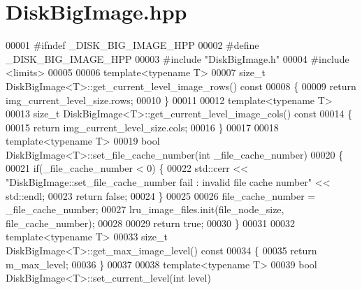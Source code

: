 \section{Disk\-Big\-Image.\-hpp}
\label{_disk_big_image_8hpp}

\begin{DoxyCode}
00001 \textcolor{preprocessor}{#ifndef \_DISK\_BIG\_IMAGE\_HPP}
00002 \textcolor{preprocessor}{}\textcolor{preprocessor}{#define \_DISK\_BIG\_IMAGE\_HPP}
00003 \textcolor{preprocessor}{}\textcolor{preprocessor}{#include "DiskBigImage.h"}
00004 \textcolor{preprocessor}{#include <limits>}
00005 
00006 \textcolor{keyword}{template}<\textcolor{keyword}{typename} T>
00007 \textcolor{keywordtype}{size\_t} DiskBigImage<T>::get_current_level_image_rows()\textcolor{keyword}{ const }
00008 \textcolor{keyword}{}\{
00009         \textcolor{keywordflow}{return} img\_current\_level\_size.rows;
00010 \}
00011 
00012 \textcolor{keyword}{template}<\textcolor{keyword}{typename} T>
00013 \textcolor{keywordtype}{size\_t} DiskBigImage<T>::get_current_level_image_cols()\textcolor{keyword}{ const }
00014 \textcolor{keyword}{}\{
00015         \textcolor{keywordflow}{return} img\_current\_level\_size.cols;
00016 \}
00017 
00018 \textcolor{keyword}{template}<\textcolor{keyword}{typename} T>
00019 \textcolor{keywordtype}{bool} DiskBigImage<T>::set_file_cache_number(\textcolor{keywordtype}{int} \_file\_cache\_number)
00020 \{
00021         \textcolor{keywordflow}{if}(\_file\_cache\_number < 0) \{
00022                 std::cerr << \textcolor{stringliteral}{"DiskBigImage::set\_file\_cache\_number fail :
       invalid file cache number"} << std::endl;
00023                 \textcolor{keywordflow}{return} \textcolor{keyword}{false};
00024         \}
00025 
00026         file\_cache\_number = \_file\_cache\_number;
00027         lru\_image\_files.init(file\_node\_size, file\_cache\_number);
00028 
00029         \textcolor{keywordflow}{return} \textcolor{keyword}{true};
00030 \}
00031 
00032 \textcolor{keyword}{template}<\textcolor{keyword}{typename} T>
00033 \textcolor{keywordtype}{size\_t} DiskBigImage<T>::get_max_image_level()\textcolor{keyword}{ const }
00034 \textcolor{keyword}{}\{
00035         \textcolor{keywordflow}{return} m\_max\_level;
00036 \}
00037 
00038 \textcolor{keyword}{template}<\textcolor{keyword}{typename} T>
00039 \textcolor{keywordtype}{bool} DiskBigImage<T>::set_current_level(\textcolor{keywordtype}{int} level)

\end{DoxyCode}
